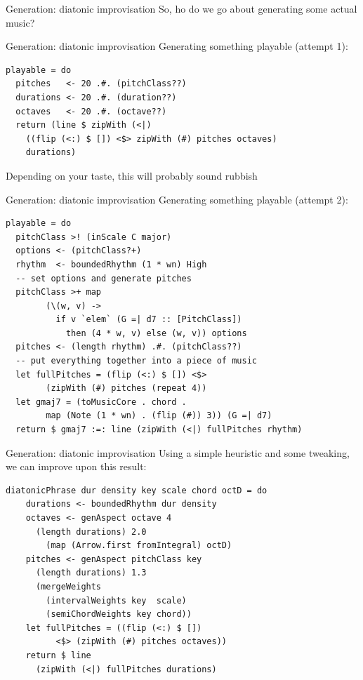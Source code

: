 \documentclass{beamer}
\begin{document}
    \begin{frame}[fragile=singleslide]{Generation: diatonic improvisation}
	So, ho do we go about generating some actual music?
	\end{frame}

    \begin{frame}[fragile=singleslide]{Generation: diatonic improvisation}
	Generating something playable (attempt 1):

    \begin{verbatim}
playable = do
  pitches   <- 20 .#. (pitchClass??)
  durations <- 20 .#. (duration??)
  octaves   <- 20 .#. (octave??)
  return (line $ zipWith (<|)
    ((flip (<:) $ []) <$> zipWith (#) pitches octaves)
    durations)
    \end{verbatim}

    Depending on your taste, this will probably sound rubbish
	\end{frame}

    \begin{frame}[fragile=singleslide]{Generation: diatonic improvisation}
	Generating something playable (attempt 2):

    \begin{verbatim}
playable = do
  pitchClass >! (inScale C major)
  options <- (pitchClass?+)
  rhythm  <- boundedRhythm (1 * wn) High
  -- set options and generate pitches
  pitchClass >+ map
        (\(w, v) ->
          if v `elem` (G =| d7 :: [PitchClass])
            then (4 * w, v) else (w, v)) options
  pitches <- (length rhythm) .#. (pitchClass??)
  -- put everything together into a piece of music
  let fullPitches = (flip (<:) $ []) <$>
        (zipWith (#) pitches (repeat 4))
  let gmaj7 = (toMusicCore . chord .
        map (Note (1 * wn) . (flip (#)) 3)) (G =| d7)
  return $ gmaj7 :=: line (zipWith (<|) fullPitches rhythm)
    \end{verbatim}
	\end{frame}

    \begin{frame}[fragile=singleslide]{Generation: diatonic improvisation}
    Using a simple heuristic and some tweaking, we can improve upon this result:
    \begin{verbatim}
diatonicPhrase dur density key scale chord octD = do
    durations <- boundedRhythm dur density
    octaves <- genAspect octave 4
      (length durations) 2.0
        (map (Arrow.first fromIntegral) octD)
    pitches <- genAspect pitchClass key
      (length durations) 1.3
      (mergeWeights
        (intervalWeights key  scale)
        (semiChordWeights key chord))
    let fullPitches = ((flip (<:) $ [])
          <$> (zipWith (#) pitches octaves))
    return $ line
      (zipWith (<|) fullPitches durations)
    \end{verbatim}
	\end{frame}
\end{document}

